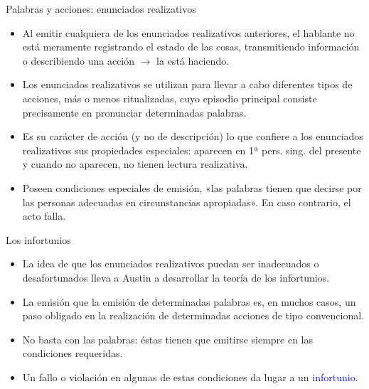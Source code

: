 \documentclass{beamer}
\begin{document}
\begin{frame}{Palabras y acciones: enunciados realizativos}

\begin{itemize}
	\item Al emitir cualquiera de los enunciados realizativos anteriores, el hablante no está meramente registrando el estado de las cosas, transmitiendo información o describiendo una acción $\rightarrow$ la está haciendo.
	\item Los enunciados realizativos se utilizan para llevar a cabo diferentes tipos de acciones, más o menos ritualizadas, cuyo episodio principal consiste precisamente en pronunciar determinadas palabras.
	\item Es su carácter de acción (y no de descripción) lo que confiere a los enunciados realizativos sus propiedades especiales: aparecen en 1ª pers. sing. del presente y cuando no aparecen, no tienen lectura realizativa.
	\item Poseen condiciones especiales de emisión, «las palabras tienen que decirse por las personas adecuadas en circunstancias apropiadas». En caso contrario, el acto falla. 
\end{itemize}

\end{frame}


\begin{frame}{Los infortunios}

\begin{itemize}
	\item La idea de que los enunciados realizativos puedan ser inadecuados o desafortunados lleva a Austin a desarrollar la teoría de los infortunios.
	\item La emisión que la emisión de determinadas palabras es, en muchos casos, un paso obligado en la realización de determinadas acciones de tipo convencional.
	\item No basta con las palabras: éstas tienen que emitirse siempre en las condiciones requeridas.
	\item Un fallo o violación en algunas de estas condiciones da lugar a un \textcolor{blue}{infortunio}.
\end{itemize}

\end{frame}
\end{document}

